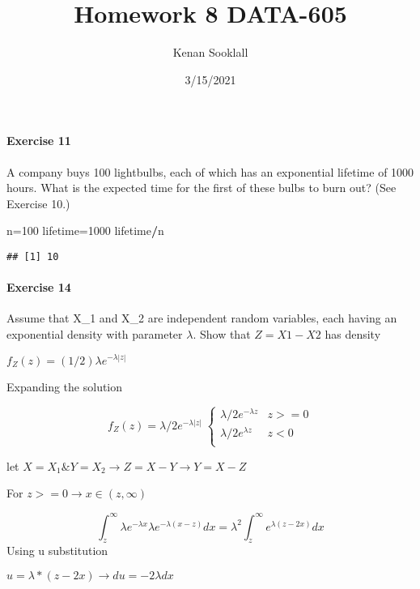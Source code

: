 \documentclass[
]{article}
\title{Homework 8 DATA-605}
\author{Kenan Sooklall}
\date{3/15/2021}
\newenvironment{Shaded}{\begin{snugshade}}{\end{snugshade}}
\newcommand{\DecValTok}[1]{\textcolor[rgb]{0.00,0.00,0.81}{#1}}
\newcommand{\NormalTok}[1]{#1}
\newcommand{\OperatorTok}[1]{\textcolor[rgb]{0.81,0.36,0.00}{\textbf{#1}}}
\begin{document}
\maketitle

\hypertarget{exercise-11}{%
\paragraph{Exercise 11}\label{exercise-11}}

A company buys 100 lightbulbs, each of which has an exponential lifetime
of 1000 hours. What is the expected time for the first of these bulbs to
burn out? (See Exercise 10.)

\begin{Shaded}
\begin{Highlighting}[]
\NormalTok{n=}\DecValTok{100}
\NormalTok{lifetime=}\DecValTok{1000}
\NormalTok{lifetime}\OperatorTok{/}\NormalTok{n}
\end{Highlighting}
\end{Shaded}

\begin{verbatim}
## [1] 10
\end{verbatim}

\hypertarget{exercise-14}{%
\paragraph{Exercise 14}\label{exercise-14}}

Assume that X\_1 and X\_2 are independent random variables, each having
an exponential density with parameter \(\lambda\). Show that
\(Z = X 1 − X 2\) has density

\(f_Z(z) = (1/2)λe^{−λ|z|}\)

Expanding the solution

\[f_Z(z) = λ/2e^{−λ|z|} \; \begin{cases} 
      λ/2e^{−λz} & z >= 0 \\
      λ/2e^{λz} & z < 0 \\
   \end{cases}\]

let \(X = X_1 \& Y = X_2 \rightarrow Z=X-Y \rightarrow Y = X - Z\)

For \(z >= 0 \rightarrow x \in (z , \infty)\)

\[ \int_{z}^{\infty}\lambda e ^{-\lambda x} \lambda e ^ {-\lambda(x-z)}dx = \lambda^2\int_{z}^{\infty} e ^{\lambda(z - 2x)} dx \]
Using u substitution

\(u = \lambda * (z - 2x) \rightarrow du=-2\lambda dx\)
\end{document}
